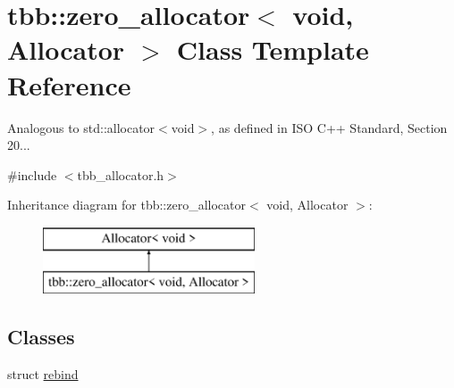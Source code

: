 \hypertarget{classtbb_1_1zero__allocator_3_01void_00_01Allocator_01_4}{}\section{tbb\+:\+:zero\+\_\+allocator$<$ void, Allocator $>$ Class Template Reference}
\label{classtbb_1_1zero__allocator_3_01void_00_01Allocator_01_4}


Analogous to std\+::allocator$<$void$>$, as defined in I\+S\+O C++ Standard, Section 20...  




{\ttfamily \#include $<$tbb\+\_\+allocator.\+h$>$}

Inheritance diagram for tbb\+:\+:zero\+\_\+allocator$<$ void, Allocator $>$\+:\begin{figure}[H]
\begin{center}
\leavevmode
\includegraphics[height=2.000000cm]{classtbb_1_1zero__allocator_3_01void_00_01Allocator_01_4}
\end{center}
\end{figure}
\subsection*{Classes}
\begin{DoxyCompactItemize}
\item 
struct \hyperlink{structtbb_1_1zero__allocator_3_01void_00_01Allocator_01_4_1_1rebind}{rebind}
\end{DoxyCompactItemize}
